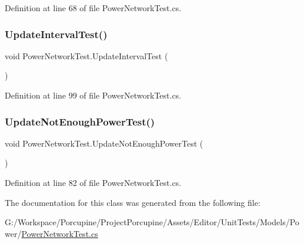 Definition at line 68 of file Power\+Network\+Test.\+cs.

\mbox{\label{class_power_network_test_a51bcfcbd863f3e9ac9f2699763a36ded}} 
\subsubsection{\texorpdfstring{Update\+Interval\+Test()}{UpdateIntervalTest()}}
{\footnotesize\ttfamily void Power\+Network\+Test.\+Update\+Interval\+Test (\begin{DoxyParamCaption}{ }\end{DoxyParamCaption})}



Definition at line 99 of file Power\+Network\+Test.\+cs.

\mbox{\label{class_power_network_test_a4ef69f3b1637027157a79be4d7719a19}} 
\subsubsection{\texorpdfstring{Update\+Not\+Enough\+Power\+Test()}{UpdateNotEnoughPowerTest()}}
{\footnotesize\ttfamily void Power\+Network\+Test.\+Update\+Not\+Enough\+Power\+Test (\begin{DoxyParamCaption}{ }\end{DoxyParamCaption})}



Definition at line 82 of file Power\+Network\+Test.\+cs.



The documentation for this class was generated from the following file\+:\begin{DoxyCompactItemize}
\item 
G\+:/\+Workspace/\+Porcupine/\+Project\+Porcupine/\+Assets/\+Editor/\+Unit\+Tests/\+Models/\+Power/\hyperlink{_power_network_test_8cs}{Power\+Network\+Test.\+cs}\end{DoxyCompactItemize}
